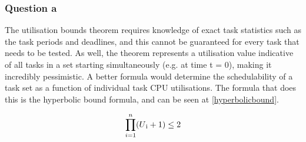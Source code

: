 \documentclass[]{report}
\begin{document}
			\subsubsection{Question a}
			The utilisation bounds theorem requires knowledge of exact task statistics such as the task periods and deadlines, and this cannot be guaranteed for every task that needs to be tested. As well, the theorem represents a utilisation value indicative of all tasks in a set starting simultaneously (e.g. at time t = 0), making it incredibly pessimistic. A better formula would determine the schedulability of a task set as a function of individual task CPU utilisations\cite{bini2001hyperbolic}. The formula that does this is the hyperbolic bound formula, and can be seen at \ref{hyperbolicbound}.
			
			\begin{equation}
			\label{hyperbolicbound}
			\prod_{i = 1}^{n}(U\textsubscript{i} + 1) \leq 2
			\end{equation}
\end{document}
